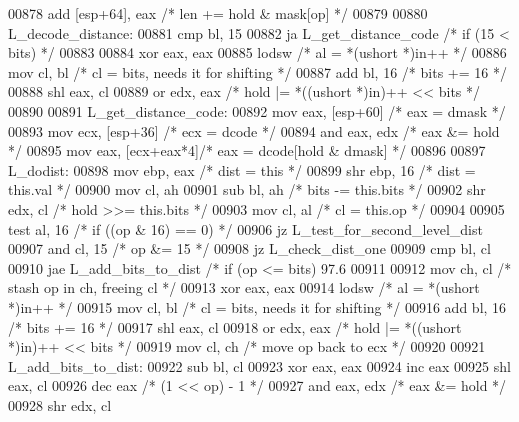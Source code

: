 \begin{DoxyCode}
{{{{{{{{{{{{{{{{{{{{{{{{{{{{{{{{{{{{{{{{{{{{{{{{{{{{{{{{{{{{{{{{{{{{{{{{{{{{{{{{{{{{{{{{{{{{{{{{{{{{{{{{{{{{{{{{{{{{{{{{{{{{{{{{{{{{{{{{{{{{{{{{{{{{{{{{{{{{{{{{{{{{{{{{{{{{{{{{{{{{{{{{{{{{{{{{{{{{{{{{{{{{{{{{{{{{{{{{{{{{{{{{{{{{{{{{{{{{{{{{{{{{{{{{{{{{{{{{{{{{{{{{{{{{{{{{{{{{{{{{{{{{{{{{{{{{{{{{{{{{{{{{{{{{{{{{{{{{{{{{{{{{{{{{{{{{{{{{{{{{{{{{{{{{{{{{{{{{{{{{{{{00878     add [esp+64], eax      \textcolor{comment}{/* len += hold & mask[op] */}
00879 
00880 L\_decode\_distance:
00881     cmp bl, 15
00882     ja  L\_get\_distance\_code  \textcolor{comment}{/* if (15 < bits) */}
00883 
00884     xor eax, eax
00885     lodsw                         \textcolor{comment}{/* al = *(ushort *)in++ */}
00886     mov cl, bl            \textcolor{comment}{/* cl = bits, needs it for shifting */}
00887     add bl, 16             \textcolor{comment}{/* bits += 16 */}
00888     shl eax, cl
00889     or  edx, eax         \textcolor{comment}{/* hold |= *((ushort *)in)++ << bits */}
00890 
00891 L\_get\_distance\_code:
00892     mov eax, [esp+60]      \textcolor{comment}{/* eax = dmask */}
00893     mov ecx, [esp+36]      \textcolor{comment}{/* ecx = dcode */}
00894     and eax, edx          \textcolor{comment}{/* eax &= hold */}
00895     mov eax, [ecx+eax*4]\textcolor{comment}{/* eax = dcode[hold & dmask] */}
00896 
00897 L\_dodist:
00898     mov ebp, eax          \textcolor{comment}{/* dist = this */}
00899     shr ebp, 16            \textcolor{comment}{/* dist = this.val */}
00900     mov cl, ah
00901     sub bl, ah            \textcolor{comment}{/* bits -= this.bits */}
00902     shr edx, cl           \textcolor{comment}{/* hold >>= this.bits */}
00903     mov cl, al            \textcolor{comment}{/* cl = this.op */}
00904 
00905     test    al, 16             \textcolor{comment}{/* if ((op & 16) == 0) */}
00906     jz  L\_test\_for\_second\_level\_dist
00907     and cl, 15             \textcolor{comment}{/* op &= 15 */}
00908     jz  L\_check\_dist\_one
00909     cmp bl, cl
00910     jae L\_add\_bits\_to\_dist   \textcolor{comment}{/* if (op <= bits) 97.6%
00911 
00912     mov ch, cl            \textcolor{comment}{/* stash op in ch, freeing cl */}
00913     xor eax, eax
00914     lodsw                         \textcolor{comment}{/* al = *(ushort *)in++ */}
00915     mov cl, bl            \textcolor{comment}{/* cl = bits, needs it for shifting */}
00916     add bl, 16             \textcolor{comment}{/* bits += 16 */}
00917     shl eax, cl
00918     or  edx, eax        \textcolor{comment}{/* hold |= *((ushort *)in)++ << bits */}
00919     mov cl, ch            \textcolor{comment}{/* move op back to ecx */}
00920 
00921 L\_add\_bits\_to\_dist:
00922     sub bl, cl
00923     xor eax, eax
00924     inc eax
00925     shl eax, cl
00926     dec eax                 \textcolor{comment}{/* (1 << op) - 1 */}
00927     and eax, edx          \textcolor{comment}{/* eax &= hold */}
00928     shr edx, cl
}}}}}}}}}}}}}}}}}}}}}}}}}}}}}}}}}}}}}}}}}}}}}}}}}}}}}}}}}}}}}}}}}}}}}}}}}}}}}}}}}}}}}}}}}}}}}}}}}}}}}}}}}}}}}}}}}}}}}}}}}}}}}}}}}}}}}}}}}}}}}}}}}}}}}}}}}}}}}}}}}}}}}}}}}}}}}}}}}}}}}}}}}}}}}}}}}}}}}}}}}}}}}}}}}}}}}}}}}}}}}}}}}}}}}}}}}}}}}}}}}}}}}}}}}}}}}}}}}}}}}}}}}}}}}}}}}}}}}}}}}}}}}}}}}}}}}}}}}}}}}}}}}}}}}}}}}}}}}}}}}}}}}}}}}}}}}}}}}}}}}}}}}}}}}}}}}}}}}}}}}}}}
\end{DoxyCode}

